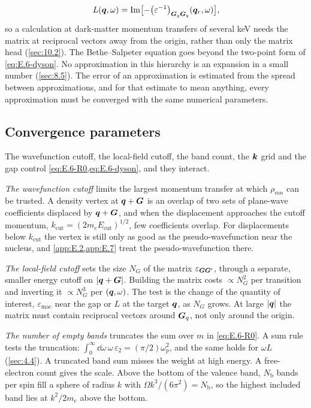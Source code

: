 \begin{equation}
  L(\bm{q},\omega) = \operatorname{Im}\bigl[-\bigl(\varepsilon^{-1}\bigr)_{\bm{G}_q\bm{G}_q}(\bm{q}_r,\omega)\bigr] ,
  \label{eq:E.6-L}
\end{equation}
so a calculation at dark-matter momentum transfers of several keV needs the matrix at reciprocal vectors away from the origin, rather than only the matrix head (\cref{sec:10.2}). The Bethe--Salpeter equation goes beyond the two-point form of \cref{eq:E.6-dyson}. No approximation in this hierarchy is an expansion in a small number (\cref{sec:8.5}). The error of an approximation is estimated from the spread between approximations, and for that estimate to mean anything, every approximation must be converged with the same numerical parameters.

\subsection{Convergence parameters}

The wavefunction cutoff, the local-field cutoff, the band count, the $\bm{k}$ grid and the gap control \cref{eq:E.6-R0,eq:E.6-dyson}, and they interact.

\emph{The wavefunction cutoff} limits the largest momentum transfer at which $\rho_{mn}$ can be trusted. A density vertex at $\bm{q}+\bm{G}$ is an overlap of two sets of plane-wave coefficients displaced by $\bm{q}+\bm{G}$, and when the displacement approaches the cutoff momentum, $k_{\mathrm{cut}} = (2m_eE_{\mathrm{cut}})^{1/2}$, few coefficients overlap. For displacements below $k_{\mathrm{cut}}$ the vertex is still only as good as the pseudo-wavefunction near the nucleus, and \cref{app:E.2,app:E.7} treat the pseudo-wavefunction there.

\emph{The local-field cutoff} sets the size $N_G$ of the matrix $\varepsilon_{\bm{G}\bm{G}'}$, through a separate, smaller energy cutoff on $|\bm{q}+\bm{G}|$. Building the matrix costs $\propto N_G^2$ per transition and inverting it $\propto N_G^3$ per $(\bm{q},\omega)$. The test is the change of the quantity of interest, $\varepsilon_{\mathrm{mac}}$ near the gap or $L$ at the target $\bm{q}$, as $N_G$ grows. At large $|\bm{q}|$ the matrix must contain reciprocal vectors around $\bm{G}_q$, not only around the origin.

\emph{The number of empty bands} truncates the sum over $m$ in \cref{eq:E.6-R0}. A sum rule tests the truncation: $\int_0^\infty\dd\omega\,\omega\,\varepsilon_2 = (\pi/2)\omega_p^2$, and the same holds for $\omega L$ (\cref{sec:4.4}). A truncated band sum misses the weight at high energy. A free-electron count gives the scale. Above the bottom of the valence band, $N_{\mathrm{b}}$ bands per spin fill a sphere of radius $k$ with $\Omega k^3/(6\pi^2) = N_{\mathrm{b}}$, so the highest included band lies at $k^2/2m_e$ above the bottom.

